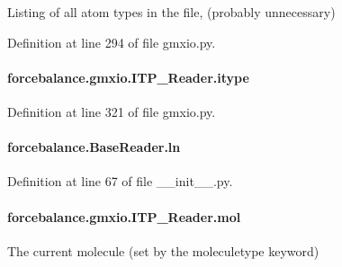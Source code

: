 Listing of all atom types in the file, (probably unnecessary) 



Definition at line 294 of file gmxio.\-py.

\hypertarget{classforcebalance_1_1gmxio_1_1ITP__Reader_a1809bf22503b8647f48ea37c9f6f4cee}{
\paragraph[{itype}]{\setlength{\rightskip}{0pt plus 5cm}forcebalance.\-gmxio.\-I\-T\-P\-\_\-\-Reader.\-itype}}\label{classforcebalance_1_1gmxio_1_1ITP__Reader_a1809bf22503b8647f48ea37c9f6f4cee}


Definition at line 321 of file gmxio.\-py.

\hypertarget{classforcebalance_1_1BaseReader_a80c8e3bea212600742968aa8669e557b}{
\paragraph[{ln}]{\setlength{\rightskip}{0pt plus 5cm}forcebalance.\-Base\-Reader.\-ln\hspace{0.3cm}{\ttfamily [inherited]}}}\label{classforcebalance_1_1BaseReader_a80c8e3bea212600742968aa8669e557b}


Definition at line 67 of file \-\_\-\-\_\-init\-\_\-\-\_\-.\-py.

\hypertarget{classforcebalance_1_1gmxio_1_1ITP__Reader_a8d70d960437fa51e58954d908fdd297d}{
\paragraph[{mol}]{\setlength{\rightskip}{0pt plus 5cm}forcebalance.\-gmxio.\-I\-T\-P\-\_\-\-Reader.\-mol}}\label{classforcebalance_1_1gmxio_1_1ITP__Reader_a8d70d960437fa51e58954d908fdd297d}


The current molecule (set by the moleculetype keyword) 




